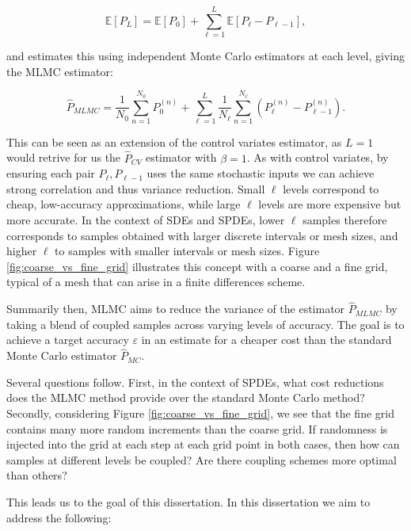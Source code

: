 \begin{equation*}
    \mathbb{E}[P_L] = \mathbb{E}[P_0] + \sum_{\ell =1}^L \mathbb{E}[P_\ell - P_{\ell -1}],
\end{equation*}

and estimates this using independent Monte Carlo estimators at each level, giving the MLMC estimator: 

\begin{equation}\label{eq:mlmc_estimator}
    \hat{P}_{MLMC} = \frac{1}{N_0} \sum_{n=1}^{N_0} P_0^{(n)} + 
    \sum_{\ell=1}^L \frac{1}{N_\ell} \sum_{n=1}^{N_\ell} \left(P_\ell^{(n)} - P_{\ell - 1}^{(n)}\right).
\end{equation}

This can be seen as an extension of the control variates estimator, as $L=1$ would retrive for us the 
$\hat{P}_{CV}$ estimator with $\beta = 1$.
As with control variates, by ensuring each pair $P_\ell, P_{\ell - 1}$ uses the same stochastic inputs 
we can achieve strong correlation and thus variance reduction. Small $\ell$ levels 
correspond to cheap, low-accuracy approximations, while large $\ell$ 
levels are more expensive but more accurate. In the context of SDEs and SPDEs, 
lower $\ell$ samples therefore corresponds to samples obtained with larger discrete intervals or mesh sizes, 
and higher $\ell$ to samples with smaller intervals or mesh sizes. 
Figure \ref{fig:coarse_vs_fine_grid} illustrates this concept with a coarse and a fine grid, typical of a 
mesh that can arise in a finite differences scheme.

Summarily then, MLMC aims to reduce the variance of the estimator $\hat{P}_{MLMC}$ by 
taking a blend of coupled samples across varying levels of accuracy. The goal 
is to achieve a target accuracy $\varepsilon$ in an estimate for a cheaper cost 
than the standard Monte Carlo estimator $\hat{P}_{MC}$. 

Several questions follow. First, in the context of SPDEs, 
what cost reductions does the MLMC method provide over the standard Monte 
Carlo method? Secondly, considering Figure \ref{fig:coarse_vs_fine_grid},
we see that the fine grid contains many more random increments than the coarse
grid. If randomness is injected into the grid at each step at each grid point 
in both cases, then how can samples at different levels be coupled? Are there 
coupling schemes more optimal than others?

This leads us to the goal of this dissertation. In this dissertation we 
aim to address the following:

